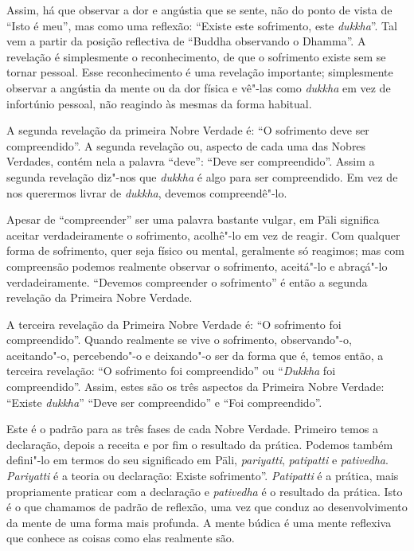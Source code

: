 Assim, há que observar a dor e angústia que se sente, não do ponto de vista de
“Isto é meu”, mas como uma reflexão: “Existe este sofrimento, este
\emph{dukkha}”. Tal vem a partir da posição reflectiva de “Buddha observando o
Dhamma”. A revelação é simplesmente o reconhecimento, de que o sofrimento existe
sem se tornar pessoal. Esse reconhecimento é uma revelação importante;
simplesmente observar a angústia da mente ou da dor física e vê"-las como
\emph{dukkha} em vez de infortúnio pessoal, não reagindo às mesmas da forma
habitual.

A segunda revelação da primeira Nobre Verdade é: “O sofrimento deve ser
compreendido”. A segunda revelação ou, aspecto de cada uma das Nobres Verdades,
contém nela a \mbox{palavra} “deve”: “Deve ser compreendido”. Assim a segunda revelação
diz"-nos que \emph{dukkha} é algo para ser compreendido. Em vez de nos querermos livrar
de \emph{dukkha}, devemos \mbox{compreendê"-lo}.

Apesar de “compreender” ser uma palavra bastante vulgar, em Pāli significa
aceitar verdadeiramente o sofrimento, acolhê"-lo em vez de reagir. Com qualquer
forma de sofrimento, quer seja físico ou mental, geralmente só reagimos; mas com
compreensão podemos realmente observar o sofrimento, aceitá"-lo e abraçá"-lo
verdadeiramente. “Devemos compreender o sofrimento” é então a segunda revelação
da Primeira Nobre Verdade.

A terceira revelação da Primeira Nobre Verdade é: “O sofrimento foi
compreendido”. Quando realmente se vive o sofrimento, observando"-o, aceitando"-o,
percebendo"-o e deixando"-o ser da forma que é, temos então, a terceira revelação:
“O sofrimento foi compreendido” ou “\emph{Dukkha} foi compreendido”. Assim,
estes são os três aspectos da Primeira Nobre Verdade: “Existe \emph{dukkha}”
“Deve ser compreendido” e “Foi compreendido”.

\sectionBreak

Este é o padrão para as três fases de cada Nobre Verdade. Primeiro temos a
declaração, depois a receita e por fim o resultado da prática. Podemos também
defini"-lo em termos do seu significado em Pāli, \emph{pariyatti},
\emph{patipatti} e \emph{pativedha}. \emph{Pariyatti} é a teoria ou declaração:
Existe sofrimento”. \emph{Patipatti} é a prática, mais propriamente praticar com
a declaração e \emph{pativedha} é o resultado da prática. Isto é o que chamamos
de padrão de reflexão, uma vez que conduz ao desenvolvimento da mente de uma
forma mais profunda. A mente búdica é uma mente reflexiva que conhece as coisas
como elas realmente são.

